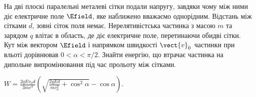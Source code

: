 
%
%


\begin{problem}
На дві плоскі паралельні металеві сітки подали напругу, завдяки чому між ними діє електричне поле $\Efield$, яке  наближено вважаємо однорідним.  Відстань між сітками $d$, зовні сіток поля немає. Нерелятивістська частинка з масою $m$ та зарядом $q$ влітає в область, де діє електричне поле, перетинаючи обидві сітки.
Кут між вектором $ \Efield $ і напрямком швидкості $ \vect{v}_0 $ частинки при вльоті дорівнював $ 0<\alpha<\pi/2 $. Знайти енергію, що втрачає частинка на дипольне випромінювання під час прольоту між сітками.
\begin{solution}
	$W = \frac{2qEv_0d}{3mc^3}\left( \sqrt{\frac{2qEd}{mv_0^2}+\cos^2\alpha} - \cos\alpha\right) $.
\end{solution}
\end{problem}

